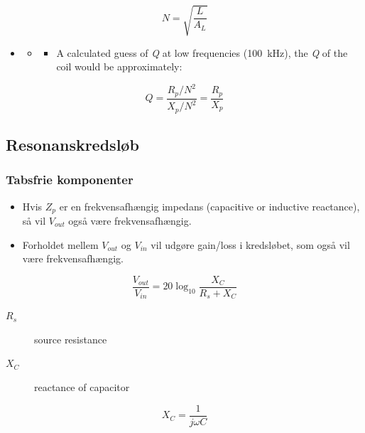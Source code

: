 \begin{equation}
N = \sqrt{\dfrac{L}{A_L}}
\end{equation}

\begin{itemize}
	\item[]
	\begin{itemize}
		\item[]
		\begin{itemize}
			\item A calculated guess of \textit{Q} at low frequencies (\SI{100}{\kilo\hertz}), the \textit{Q} of	the coil would be approximately:
		\end{itemize} 
	\end{itemize} 
\end{itemize}

\begin{equation}
Q = \dfrac{R_p/N^2}{X_p/N^2} = \dfrac{R_p}{X_p}
\end{equation}

\subsection{Resonanskredsløb}
\subsubsection{Tabsfrie komponenter}
\begin{itemize}
	\item Hvis $Z_p$ er en frekvensafhængig impedans (capacitive or inductive reactance), så vil $V_{out}$ også være frekvensafhængig.
	\item Forholdet mellem $V_{out}$ og $V_{in}$ vil udgøre gain/loss i kredsløbet, som også vil være frekvensafhængig. 
\end{itemize}

\begin{equation}
\dfrac{V_{out}}{V_{in}} = 20\log_{10}\dfrac{X_C}{R_s+X_C}
\end{equation}

\begin{description}
	\item[$R_s$] source resistance
	\item[$X_C$] reactance of capacitor
\end{description}

\begin{equation}
X_C=\dfrac{1}{j\omega C}
\end{equation}

